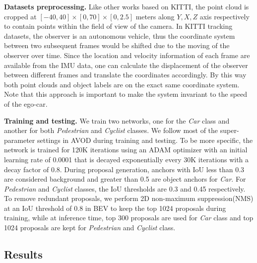 \documentclass{bmvc2k}
\begin{document}
\textbf{Datasets preprocessing.} Like other works based on KITTI, the point cloud is cropped at $[-40, 40] \times [0, 70] \times [0, 2.5]$ meters along $Y, X, Z$ axis respectively to contain points within the field of view of the camera. In KITTI tracking datasets, the observer is an autonomous vehicle, thus the coordinate system between two subsequent frames would be shifted due to the moving of the observer over time. Since the location and velocity information of each frame are available from the IMU data, one can calculate the displacement of the observer between different frames and translate the coordinates accordingly. By this way both point clouds and object labels are on the exact same coordinate system. Note that this approach is important to make the system invariant to the speed of the ego-car.

\textbf{Training and testing.} We train two networks, one for the \textit{Car} class and another for both \textit{Pedestrian} and \textit{Cyclist} classes. We follow most of the super-parameter settings in AVOD\cite{ku2018joint} during training and testing. To be more specific, the network is trained for 120K iterations using an ADAM\cite{kingma2014adam} optimizer with an initial learning rate of 0.0001 that is decayed exponentially every 30K iterations with a decay factor of 0.8. During proposal generation, anchors with IoU less than 0.3 are considered background and greater than 0.5 are object anchors for \textit{Car}. For \textit{Pedestrian} and \textit{Cyclist} classes, the IoU thresholds are 0.3 and 0.45 respectively. To remove redundant proposals, we perform 2D non-maximum suppression(NMS) at an IoU threshold of 0.8 in BEV to keep the top 1024 proposals during training, while at inference time, top 300 proposals are used for \textit{Car} class and top 1024 proposals are kept for \textit{Pedestrian} and \textit{Cyclist} class.

\subsection{Results}
\end{document}
